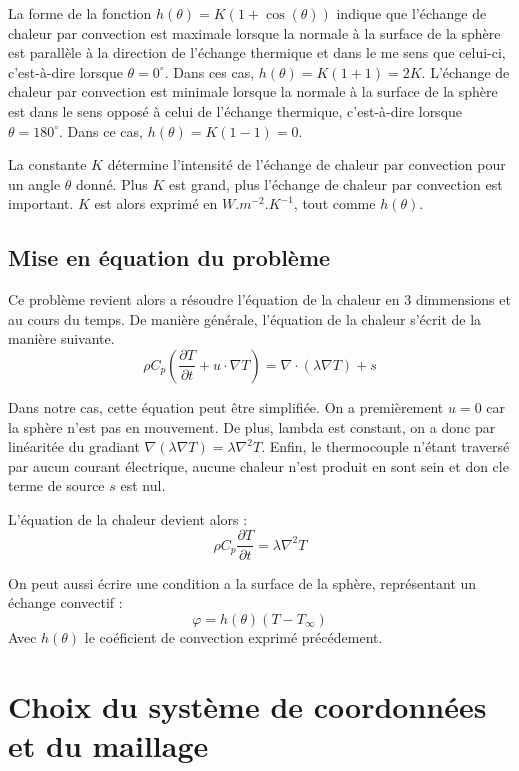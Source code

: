 \documentclass[fleqn]{article}
\renewcommand{\phi}{\varphi}
\begin{document}
La forme de la fonction $h(\theta) = K (1 + \cos(\theta))$ indique que l'échange de chaleur par convection est maximale lorsque la normale à la surface de la sphère est parallèle à la direction de l'échange thermique et dans le me sens que celui-ci, c'est-à-dire lorsque $\theta = 0^\circ$. Dans ces cas, $h(\theta) = K (1 + 1) = 2K$. L'échange de chaleur par convection est minimale lorsque la normale à la surface de la sphère est dans le sens opposé à celui de l'échange thermique, c'est-à-dire lorsque $\theta = 180^\circ$. Dans ce cas, $h(\theta) = K (1 - 1) = 0$.

La constante $K$ détermine l'intensité de l'échange de chaleur par convection pour un angle $\theta$ donné. Plus $K$ est grand, plus l'échange de chaleur par convection est important. $K$ est alors exprimé en $W.m^{-2}.K^{-1}$, tout comme $h(\theta)$.

\subsection{Mise en équation du problème}
Ce problème revient alors a résoudre l'équation de la chaleur en 3 dimmensions et au cours du temps.
De manière générale, l'équation de la chaleur s'écrit de la manière suivante.
\begin{equation}
    \rho C_p \left(  \frac{ \partial T}{\partial t} + u \cdot \nabla T \right) = \nabla \cdot ( \lambda  \nabla T) + s
\end{equation}

Dans notre cas, cette équation peut être simplifiée. On a premièrement $u = 0$ car la sphère n'est pas en mouvement. De plus, lambda est constant, on a donc par linéaritée du gradiant $\nabla ( \lambda \nabla T ) = \lambda \nabla^2 T$. Enfin, le thermocouple n'étant traversé par aucun courant électrique, aucune chaleur n'est produit en sont sein et don cle terme de source $s$ est nul.

L'équation de la chaleur devient alors :
\begin{equation}
    \rho C_p   \frac{ \partial T}{\partial t} = \lambda\nabla^2 T
    \label{equation de la chaleur}
\end{equation}

On peut aussi écrire une condition a la surface de la sphère, représentant un échange convectif :
\[
\phi = h(\theta)(T-T_\infty)
\] 
Avec $h(\theta)$ le coéficient de convection exprimé précédement.


\newpage
\section{Choix du système de coordonnées et du maillage}
\end{document}
